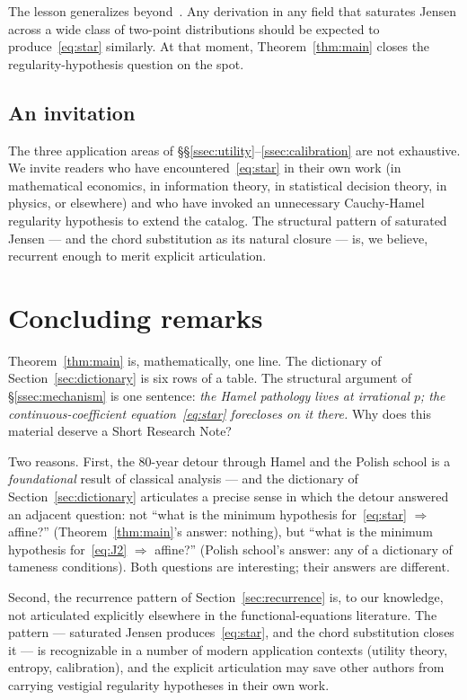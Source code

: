 \documentclass[review,12pt,a4paper]{elsarticle}
\theoremstyle{remark}
\begin{document}
The lesson generalizes beyond~\cite{El2}. Any derivation in any field that
saturates Jensen across a wide class of two-point distributions should be
expected to produce~\eqref{eq:star} similarly. At that moment,
Theorem~\ref{thm:main} closes the regularity-hypothesis question on the
spot.

\subsection{An invitation}
\label{ssec:invitation}

The three application areas of \S\S\ref{ssec:utility}--\ref{ssec:calibration}
are not exhaustive. We invite readers who have encountered~\eqref{eq:star}
in their own work (in mathematical economics, in information theory, in
statistical decision theory, in physics, or elsewhere) and who have
invoked an unnecessary Cauchy-Hamel regularity hypothesis to extend the
catalog. The structural pattern of saturated Jensen --- and the chord
substitution as its natural closure --- is, we believe, recurrent enough
to merit explicit articulation.

\section{Concluding remarks}
\label{sec:conclusion}

Theorem~\ref{thm:main} is, mathematically, one line. The dictionary of
Section~\ref{sec:dictionary} is six rows of a table. The structural
argument of \S\ref{ssec:mechanism} is one sentence: \emph{the Hamel
pathology lives at irrational $p$; the continuous-coefficient
equation~\eqref{eq:star} forecloses on it there.} Why does this material
deserve a Short Research Note?

Two reasons. First, the 80-year detour through Hamel and the Polish school
is a \emph{foundational} result of classical analysis --- and the
dictionary of Section~\ref{sec:dictionary} articulates a precise sense in
which the detour answered an adjacent question: not ``what is the minimum
hypothesis for~\eqref{eq:star} $\Rightarrow$ affine?''
(Theorem~\ref{thm:main}'s answer: nothing), but ``what is the minimum
hypothesis for~\eqref{eq:J2} $\Rightarrow$ affine?'' (Polish school's
answer: any of a dictionary of tameness conditions). Both questions are
interesting; their answers are different.

Second, the recurrence pattern of Section~\ref{sec:recurrence} is, to our
knowledge, not articulated explicitly elsewhere in the functional-equations
literature. The pattern --- saturated Jensen produces~\eqref{eq:star},
and the chord substitution closes it --- is recognizable in a number of
modern application contexts (utility theory, entropy, calibration), and
the explicit articulation may save other authors from carrying vestigial
regularity hypotheses in their own work.
\end{document}
